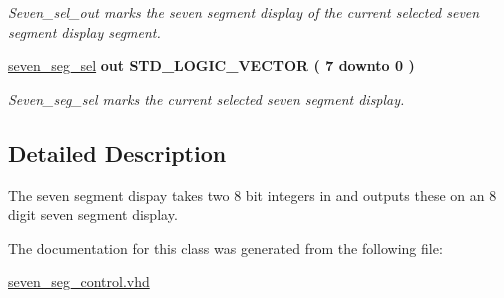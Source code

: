 \begin{DoxyCompactItemize}
\begin{DoxyCompactList}\small\item\em Seven\-\_\-sel\-\_\-out marks the seven segment display of the current selected seven segment display segment. \end{DoxyCompactList}\item 
\hypertarget{classseven__seg__control_ae1646bd2ce2b0e1d1bb85bf2a88d1b5f}{\hyperlink{classseven__seg__control_ae1646bd2ce2b0e1d1bb85bf2a88d1b5f}{seven\-\_\-seg\-\_\-sel}  {\bfseries {\bfseries \textcolor{vhdlkeyword}{out}\textcolor{vhdlchar}{ }}} {\bfseries \textcolor{comment}{S\-T\-D\-\_\-\-L\-O\-G\-I\-C\-\_\-\-V\-E\-C\-T\-O\-R}\textcolor{vhdlchar}{ }\textcolor{vhdlchar}{(}\textcolor{vhdlchar}{ }\textcolor{vhdlchar}{ } \textcolor{vhdldigit}{7} \textcolor{vhdlchar}{ }\textcolor{vhdlchar}{ }\textcolor{vhdlchar}{ }\textcolor{vhdlkeyword}{downto}\textcolor{vhdlchar}{ }\textcolor{vhdlchar}{ }\textcolor{vhdlchar}{ } \textcolor{vhdldigit}{0} \textcolor{vhdlchar}{ }\textcolor{vhdlchar}{)}\textcolor{vhdlchar}{ }} }\label{classseven__seg__control_ae1646bd2ce2b0e1d1bb85bf2a88d1b5f}

\begin{DoxyCompactList}\small\item\em Seven\-\_\-seg\-\_\-sel marks the current selected seven segment display. \end{DoxyCompactList}\end{DoxyCompactItemize}


\subsection{Detailed Description}
The seven segment dispay takes two 8 bit integers in and outputs these on an 8 digit seven segment display. 

The documentation for this class was generated from the following file\-:\begin{DoxyCompactItemize}
\item 
\hyperlink{seven__seg__control_8vhd}{seven\-\_\-seg\-\_\-control.\-vhd}\end{DoxyCompactItemize}
